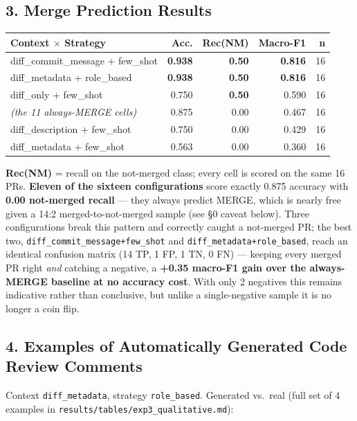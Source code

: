 \documentclass{experimentreport}
\begin{document}
{\subsection*{3. Merge Prediction Results}

\begin{center}
\small
\begin{tabular}{|l|r|r|r|r|}
\hline
\textbf{Context $\times$ Strategy} & \textbf{Acc.} & \textbf{Rec(NM)} & \textbf{Macro-F1} & \textbf{n} \\
\hline
diff\_commit\_message + few\_shot & \textbf{0.938} & \textbf{0.50} & \textbf{0.816} & 16 \\
diff\_metadata + role\_based   & \textbf{0.938} & \textbf{0.50} & \textbf{0.816} & 16 \\
diff\_only + few\_shot         & 0.750 & \textbf{0.50} & 0.590 & 16 \\
\emph{(the 11 always-MERGE cells)} & 0.875 & 0.00 & 0.467 & 16 \\
diff\_description + few\_shot  & 0.750 & 0.00 & 0.429 & 16 \\
diff\_metadata + few\_shot     & 0.563 & 0.00 & 0.360 & 16 \\
\hline
\end{tabular}
\end{center}
\noindent\textbf{Rec(NM)} = recall on the not-merged class; every cell is scored on the same 16 PRs.
\textbf{Eleven of the sixteen configurations} score exactly 0.875 accuracy with \textbf{0.00
not-merged recall} --- they always predict MERGE, which is nearly free given a 14:2
merged-to-not-merged sample (see \S0 caveat below). Three configurations break this pattern and
correctly caught a not-merged PR; the best two, \texttt{diff\_commit\_message+few\_shot} and
\texttt{diff\_metadata+role\_based}, reach an identical confusion matrix (14 TP, 1 FP, 1 TN, 0 FN)
--- keeping every merged PR right \emph{and} catching a negative, a \textbf{+0.35 macro-F1 gain over
the always-MERGE baseline at no accuracy cost}. With only 2 negatives this remains indicative rather
than conclusive, but unlike a single-negative sample it is no longer a coin flip.

\subsection*{4. Examples of Automatically Generated Code Review Comments}

Context \texttt{diff\_metadata}, strategy \texttt{role\_based}. Generated vs.\ real (full set of 4
examples in \texttt{results/tables/exp3\_qualitative.md}):

}
\end{document}
